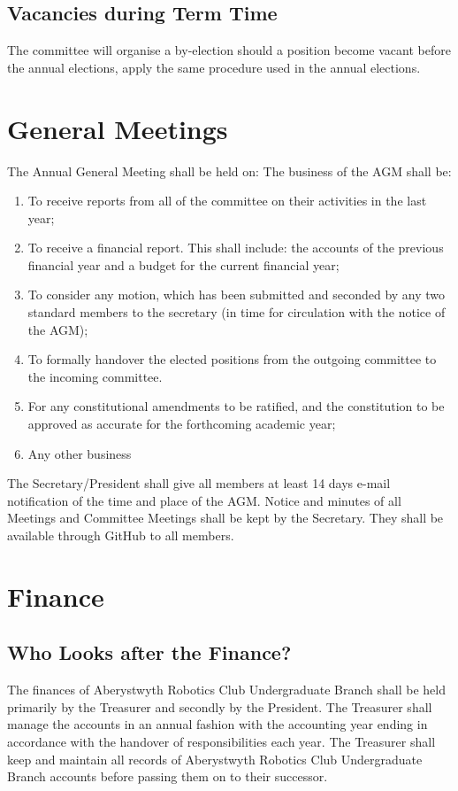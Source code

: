 \documentclass[a4paper,11pt]{article}
\begin{document}
\subsection{Vacancies during Term Time}
The committee will organise a by-election should a position become vacant before the annual elections, apply the same procedure used in the annual elections.

\section{General Meetings}
The Annual General Meeting shall be held on:\newline
The business of the AGM shall be:
\begin{enumerate}[nolistsep]
  \item To receive reports from all of the committee on their activities in the last year;
  \item To receive a financial report. This shall include: the accounts of the previous financial year and a budget for the current financial year;
  \item To consider any motion, which has been submitted and seconded by any two standard members to the secretary (in time for circulation with the notice of the AGM);
  \item To formally handover the elected positions from the outgoing committee to the incoming committee.
  \item For any constitutional amendments to be ratified, and the constitution to be approved as accurate for the forthcoming academic year;
  \item Any other business
\end{enumerate}
The Secretary/President shall give all members at least 14 days e-mail notification of the time and place of the AGM.\newline
Notice and minutes of all Meetings and Committee Meetings shall be kept by the Secretary.\newline
They shall be available through GitHub to all members.

\section{Finance}
\subsection{Who Looks after the Finance?}
The finances of Aberystwyth Robotics Club Undergraduate Branch shall be held primarily by the Treasurer and secondly by the President.\newline
The Treasurer shall manage the accounts in an annual fashion with the accounting year ending in accordance with the handover of responsibilities each year.\newline
The Treasurer shall keep and maintain all records of Aberystwyth Robotics Club Undergraduate Branch accounts before passing them on to their successor.
\end{document}
